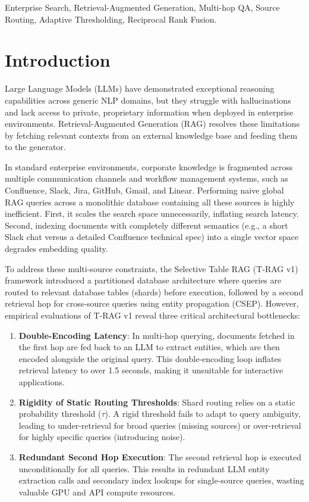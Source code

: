 \documentclass[conference]{IEEEtran}
\begin{document}
\begin{IEEEkeywords}
Enterprise Search, Retrieval-Augmented Generation, Multi-hop QA, Source Routing, Adaptive Thresholding, Reciprocal Rank Fusion.
\end{IEEEkeywords}

\section{Introduction}
Large Language Models (LLMs) have demonstrated exceptional reasoning capabilities across generic NLP domains, but they struggle with hallucinations and lack access to private, proprietary information when deployed in enterprise environments. Retrieval-Augmented Generation (RAG) resolves these limitations by fetching relevant contexts from an external knowledge base and feeding them to the generator.

In standard enterprise environments, corporate knowledge is fragmented across multiple communication channels and workflow management systems, such as Confluence, Slack, Jira, GitHub, Gmail, and Linear. Performing naive global RAG queries across a monolithic database containing all these sources is highly inefficient. First, it scales the search space unnecessarily, inflating search latency. Second, indexing documents with completely different semantics (e.g., a short Slack chat versus a detailed Confluence technical spec) into a single vector space degrades embedding quality.

To address these multi-source constraints, the Selective Table RAG (T-RAG v1) framework introduced a partitioned database architecture where queries are routed to relevant database tables (shards) before execution, followed by a second retrieval hop for cross-source queries using entity propagation (CSEP). However, empirical evaluations of T-RAG v1 reveal three critical architectural bottlenecks:
\begin{enumerate}
    \item \textbf{Double-Encoding Latency}: In multi-hop querying, documents fetched in the first hop are fed back to an LLM to extract entities, which are then encoded alongside the original query. This double-encoding loop inflates retrieval latency to over 1.5 seconds, making it unsuitable for interactive applications.
    \item \textbf{Rigidity of Static Routing Thresholds}: Shard routing relies on a static probability threshold ($\tau$). A rigid threshold fails to adapt to query ambiguity, leading to under-retrieval for broad queries (missing sources) or over-retrieval for highly specific queries (introducing noise).
    \item \textbf{Redundant Second Hop Execution}: The second retrieval hop is executed unconditionally for all queries. This results in redundant LLM entity extraction calls and secondary index lookups for single-source queries, wasting valuable GPU and API compute resources.
\end{enumerate}
\end{document}

